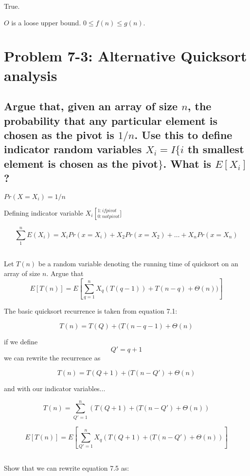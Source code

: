 \documentclass[titlepage]{article}\usepackage[]{graphicx}\usepackage[]{color}
\begin{document}
True. 

$O$ is a loose upper bound. $0 \leq f(n) \leq g(n)$. 

\section{ Problem 7-3: Alternative Quicksort analysis}
\subsection{ 
Argue that, given an array of size $n$, the probability that any particular element
is chosen as the pivot is $1/n$. Use this to define indicator random variables
$X_i = I\{ i$ th smallest element is chosen as the pivot$\}$. What is
$E[X_i]$?}

$Pr(X=X_i) = 1/n$

Defining indicator variable $X_i \left[_{0: not pivot}^{1: if pivot}\right.]$

\[ \sum_{1}^{n} E(X_i) = X_i Pr(x=X_i) + X_2Pr(x = X_2) + \dots + X_n
Pr(x=X_n) \]



\subsection{}
Let $T(n)$ be a random variable denoting the running time of quicksort on an
array of size $n$. Argue that \\
\[ E[T(n)] = E \left[ \sum_{q=1}^{n} X_q (T(q-1)) + T(n-q) + \Theta(n))\right] \]

The basic quicksort recurrence is taken from equation 7.1:

\[ T(n) = T(Q) + (T(n-q-1) + \Theta(n) \]

if we define 
\[ Q' = q +1 \]
we can rewrite the recurrence as 

\[ T(n) = T(Q+1) + (T(n-Q') + \Theta(n) \]

and with our indicator variables...

\[ T(n) = \sum_{Q' = 1}^{n} \left( T(Q+1) + (T(n-Q') + \Theta(n) \right) \]

\[ E\left[T(n)\right] = E\left[ \sum_{Q' = 1}^{n} X_q \left( T(Q+1) + (T(n-Q') + \Theta(n) \right) \right] \]



\subsection{}
Show that we can rewrite equation 7.5 as:
\end{document}
